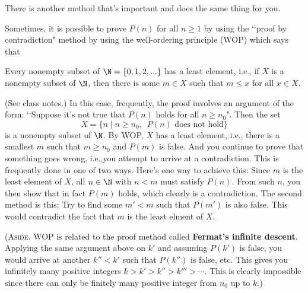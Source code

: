 There is another method that's important and does the same thing for you.

Sometimes, it is possible to prove $P(n)$ for all $n \geq 1$ by using the
\lq\lq proof by contradiction" method by using
the well-ordering principle (WOP) which says that
\begin{tightlist}
  \li Every nonempty subset of $\N = \{0, 1, 2, ...\}$ has a least element,
  i.e., if $X$ is a nonempty subset of $\N$, then there is some
  $m \in X$ such that $m \leq x$ for all $x \in X$.
\end{tightlist}
(See class notes.)
In this case, frequently, the proof involves an argument of the form:
\lq\lq Suppose it's not true that $P(n)$ holds for all $n \geq n_0$".
Then the set
\[
X = \{ n \mid n \geq n_0, \,\,\, P(n) \text{ does not hold}\}
\]
is a nonempty subset of $\N$.
By WOP, $X$ has a least element, i.e.,
there is a smallest $m$ such that $m \geq n_0$ and $P(m)$ is false.
And you continue to prove that something goes wrong,
i.e.,you attempt to arrive at a contradiction.
This is frequently done in one of two ways.
Here's one way to achieve this:
Since $m$ is the least element of $X$,
all $n \in \N$ with $n < m$ must satisfy $P(n)$.
From such $n$, you then show that in fact $P(m)$ holds, which
clearly is a contradiction.
The second method is this:
Try to find some $m' < m$
such that $P(m')$ is also false.
This would contradict the fact that $m$ is the least elment of
$X$.

(\textsc{Aside.}
WOP is related to the proof method called \textbf{Fermat's infinite descent}.
Applying the same argument above on $k'$ and assuming $P(k')$ is false,
you would arrive at another
$k'' < k'$ such that $P(k'')$ is false, etc.
This gives you infinitely many positive integers
$k > k' > k'' > k''' > \cdots$.
This is clearly impossible since there can only be finitely many positive
integer from $n_0$ up to $k$.)

